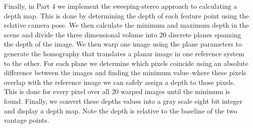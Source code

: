 \documentclass[a4paper]{article}
\begin{document}
Finally, in Part 4 we implement the sweeping-stereo approach to calculating a depth map.  This is done by determining the depth of each feature point using the relative camera pose.  We then calculate the minimum and maximum depth in the scene and divide the three dimensional volume into 20 discrete planes spanning the depth of the image. We then warp one image using the plane parameters to generate the homography that translates a planar image in one reference system to the other. For each plane we determine which pixels coincide using an absolute difference between the images and finding the minimum value--where these pixels overlap with the reference image we can safely assign a depth to those pixels.  This is done for every pixel over all 20 warped images until the minimum is found. Finally, we convert these depths values into a gray scale eight bit integer and display a depth map.  Note the depth is relative to the baseline of the two vantage points.
\end{document}
